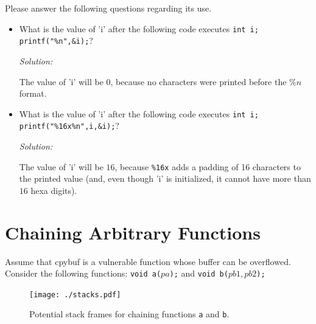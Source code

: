 \documentclass[a4paper,11pt]{article}
\newenvironment{solution}%
{\par{\noindent\small\textit{Solution:}}\vspace{-12pt}\begin{framed}}%
{\end{framed}\par}
\begin{document}
\noindent Please answer the following questions regarding its use.

\begin{itemize}
\item What is the value of 'i' after the following code executes
\texttt{int i; printf("\%n",\&i);}?
\ifsolution\begin{solution}
The value of 'i' will be $0$, because no characters were printed before the $\%n$ format.
\end{solution}\fi
\item What is the value of 'i' after the following code executes \texttt{int i;
    printf("\%16x\%n",i,\&i);}?
\ifsolution\begin{solution}
The value of 'i' will be $16$, because \texttt{\%16x} adds a padding of 16 characters to the printed value
(and, even though 'i' is initialized, it cannot have more than $16$ hexa digits).
\end{solution}\fi
\end{itemize}

\section*{Chaining Arbitrary Functions}
Assume that cpybuf is a vulnerable function whose buffer can be
overflowed. Consider the following functions: \texttt{void a(\(pa\));} and
\texttt{void b(\(pb1, pb2\));} 

\begin{figure}[t]
    \centering
    \texttt{[image: ./stacks.pdf]}
    \caption{Potential stack frames for chaining functions \texttt{a} and \texttt{b}.}
    \label{fig:stacks}
\end{figure}
\end{document}
